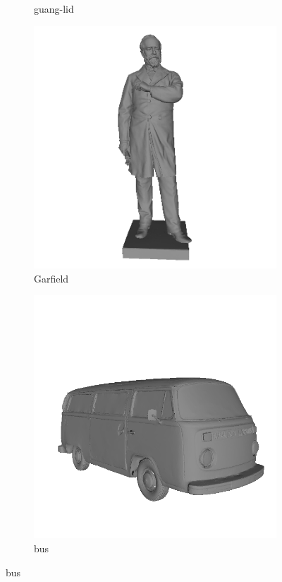\begin{figure}
\begin{subfigure}[b]{0.23\linewidth}
	\caption{guang-lid}
\end{subfigure}
\begin{subfigure}[b]{0.23\linewidth}
	\includegraphics[width=\linewidth]{./Figures/test-dataset/00.garfield.png}
	\caption{Garfield}
\end{subfigure}
\begin{subfigure}[b]{0.23\linewidth}
	\includegraphics[width=\linewidth]{./Figures/test-dataset/01.Bus.png}
	\caption{bus}
\end{subfigure}


\end{figure}
